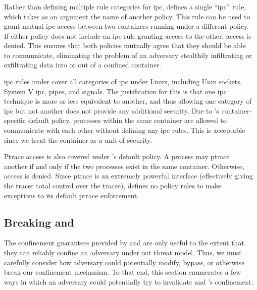 \subsubsection{\bpfcontain{}}

Rather than defining multiple rule categories for \gls{ipc}, \bpfcontain{} defines
a single \enquote{\gls{ipc}} rule, which takes as an argument the name of another
\bpfcontain{} policy. This rule can be used to grant mutual \gls{ipc} access between two
containers running under a different policy. If either policy does not include an
\gls{ipc} rule granting access to the other, access is denied. This ensures that both
policies mutually agree that they should be able to communicate, eliminating the problem
of an adversary stealthily infiltrating or exfiltrating data into or out of a confined
container.

\gls{ipc} rules under \bpfcontain{} cover all categories of \gls{ipc} under Linux,
including Unix sockets, System V \gls{ipc}, pipes, and signals. The justification for this
is that one \gls{ipc} technique is more or less equivalent to another, and thus allowing
one category of \gls{ipc} but not another does not provide any additional security. Due to
\bpfcontain{}'s container-specific default policy, processes within the same container are
allowed to communicate with each other without defining any \gls{ipc} rules. This is
acceptable since we treat the container as a unit of security.

Ptrace access is also covered under \bpfcontain{}'s default policy. A process may ptrace
another if and only if the two processes exist in the same container. Otherwise, access is
denied. Since ptrace is an extremely powerful interface (effectively giving the tracer
total control over the tracee), \bpfcontain{} defines no policy rules to make exceptions
to its default ptrace enforcement.

\subsection{Breaking \bpfbox{} and \bpfcontain{}}

The confinement guarantees provided by \bpfbox{} and \bpfcontain{} are only useful to the
extent that they can reliably confine an adversary under out threat model. Thus, we must
carefully consider how adversary could potentially modify, bypass, or otherwise break our
confinement mechanism. To that end, this section enumerates a few ways in which an
adversary could potentially try to invalidate \bpfbox{} and \bpfcontain{}'s confinement.

